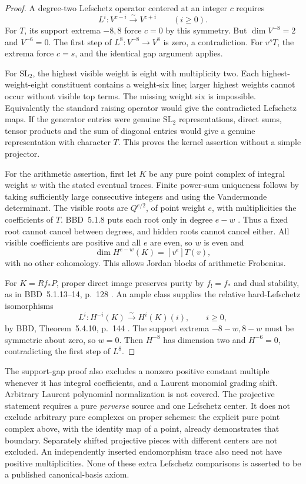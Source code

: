 \begin{proof}
A degree-two Lefschetz operator centered at an
integer \(c\) requires
\[
                   L^i:V^{c-i}\xrightarrow{\sim}V^{c+i}
                         \qquad(i\ge0).
\]
For \(T\), its support extrema \(-8,8\)
force \(c=0\) by this symmetry.
But \(\dim V^{-8}=2\) and \(V^{-6}=0\).
The first step of \(L^8:V^{-8}\to V^8\)
is zero, a contradiction.
For \(v^sT\), the extrema force \(c=s\),
and the identical gap argument applies.

For \(\mathrm{SL}_2\), the highest visible
weight is eight with multiplicity two.
Each highest-weight-eight constituent contains
a weight-six line; larger highest weights
cannot occur without visible top terms.
The missing weight six is impossible.
Equivalently the standard raising operator
would give the contradicted Lefschetz maps.
If the generator entries were genuine
\(\mathrm{SL}_2\) representations, direct
sums, tensor products and the sum of diagonal
entries would give a genuine representation
with character \(T\). This proves the
kernel assertion without a simple projector.

For the arithmetic assertion, first let \(K\)
be any pure point complex of integral weight
\(w\) with the stated eventual traces.
Finite power-sum uniqueness follows by taking
sufficiently large consecutive integers and
using the Vandermonde determinant.
The visible roots are \(Q^{e/2}\), of point
weight \(e\), with multiplicities the
coefficients of \(T\).
BBD~5.1.8 puts each root only in degree
\(e-w\) \cite{BBD}.
Thus a fixed root cannot cancel between
degrees, and hidden roots cannot cancel either.
All visible coefficients are positive and all
\(e\) are even, so \(w\) is even and
\[
                 \dim H^{e-w}(K)=[v^e]T(v),
\]
with no other cohomology. This allows Jordan
blocks of arithmetic Frobenius.

For \(K=Rf_*P\), proper direct image
preserves purity by \(f_!=f_*\) and dual
stability, as in BBD~5.1.13--14, p.~128
\cite{BBD}.
An ample class supplies the relative
hard-Lefschetz isomorphisms
\[
          L^i:H^{-i}(K)\xrightarrow{\sim}H^i(K)(i),
                               \qquad i\ge0,
\]
by BBD, Theorem~5.4.10, p.~144 \cite{BBD}.
The support extrema \(-8-w,8-w\) must be
symmetric about zero, so \(w=0\).
Then \(H^{-8}\) has dimension two and
\(H^{-6}=0\), contradicting the first step
of \(L^8\).
\end{proof}

The support-gap proof also excludes a nonzero
positive constant multiple whenever it has
integral coefficients, and a Laurent monomial
grading shift. Arbitrary Laurent polynomial
normalization is not covered.
The projective statement requires a pure
\emph{perverse} source and one Lefschetz center.
It does not exclude arbitrary pure complexes
on proper schemes: the explicit pure point
complex above, with the identity map of a
point, already demonstrates that boundary.
Separately shifted projective pieces with
different centers are not excluded.
An independently inserted endomorphism trace
also need not have positive multiplicities.
None of these extra Lefschetz comparisons is
asserted to be a published canonical-basis axiom.

